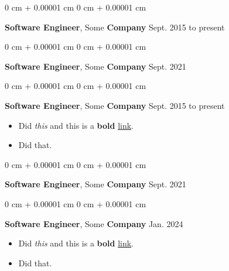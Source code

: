 \documentclass[10pt, letterpaper]{article}
\newenvironment{highlights}{
    \begin{itemize}[
        topsep=0.10 cm,
        parsep=0.10 cm,
        partopsep=0pt,
        itemsep=0pt,
        leftmargin=0 cm + 10pt
    ]
}{
    \end{itemize}
        
    \vspace{-0.20cm}
} %
\newenvironment{onecolentry}{
    \begin{adjustwidth}{
        0 cm + 0.00001 cm
    }{
        0 cm + 0.00001 cm
    }
}{
    \end{adjustwidth}
} %
\begin{document}
        \vspace{0.1 cm}

        \begin{onecolentry}
            \textbf{Software Engineer}, Some \textbf{Company} \hfill Sept. 2015 to present
        \end{onecolentry}

        \vspace{0.1 cm}

        \begin{onecolentry}
            \textbf{Software Engineer}, Some \textbf{Company} \hfill Sept. 2021
        \end{onecolentry}

        \vspace{0.1 cm}

        \begin{onecolentry}
            \textbf{Software Engineer}, Some \textbf{Company} \hfill Sept. 2015 to present
            \begin{highlights}
                \item Did \textit{this} and this is a \textbf{bold} \href{https://example.com}{link}.
                \item Did that.
            \end{highlights}
        \end{onecolentry}

        \vspace{0.1 cm}

        \begin{onecolentry}
            \textbf{Software Engineer}, Some \textbf{Company} \hfill Sept. 2021
        \end{onecolentry}

        \vspace{0.1 cm}

        \begin{onecolentry}
            \textbf{Software Engineer}, Some \textbf{Company} \hfill Jan. 2024
            \begin{highlights}
                \item Did \textit{this} and this is a \textbf{bold} \href{https://example.com}{link}.
                \item Did that.
            \end{highlights}
        \end{onecolentry}

        \vspace{0.1 cm}
\end{document}
